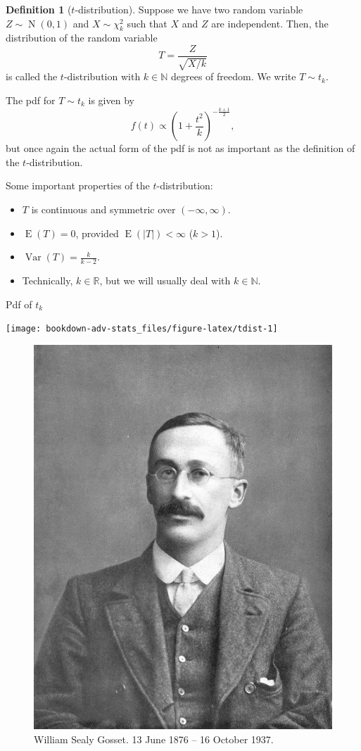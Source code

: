\documentclass[
]{book}
\providecommand{\tightlist}{%
  \setlength{\itemsep}{0pt}\setlength{\parskip}{0pt}}
\DeclareMathOperator{\E}{E}
\DeclareMathOperator{\Var}{Var}
\DeclareMathOperator{\N}{N}
\newcommand{\bbR}{\mathbb{R}}
\newcommand{\bbN}{\mathbb{N}}
\theoremstyle{definition}
\newtheorem{definition}{Definition}[chapter]
\theoremstyle{definition}
\theoremstyle{definition}
\theoremstyle{definition}
\theoremstyle{remark}
\begin{document}
\begin{definition}[$t$-distribution]
Suppose we have two random variable \(Z\sim\N(0,1)\) and \(X\sim\chi^2_k\) such that \(X\) and \(Z\) are independent.
Then, the distribution of the random variable
\[T = \frac{Z}{\sqrt{X/k}}\] is called the \(t\)-distribution with \(k\in\bbN\)
degrees of freedom. We write \(T\sim t_k\).
\end{definition}

The pdf for \(T \sim t_k\) is given by
\[f(t) \propto \left(1 + \frac{t^2}{k} \right)^{-\frac{k+1}{2}},\] but
once again the actual form of the pdf is not as important as the
definition of the \(t\)-distribution.

Some important properties of the \(t\)-distribution:

\begin{itemize}
\tightlist
\item
  \(T\) is continuous and symmetric over \((-\infty,\infty)\).
\item
  \(\E(T)=0\), provided \(\E(|T|) < \infty\) (\(k>1\)).
\item
  \(\Var(T) = \frac{k}{k-2}\).
\item
  Technically, \(k\in\bbR\), but we will usually deal with \(k\in\bbN\).
\end{itemize}

Pdf of \(t_k\)

\begin{center}\texttt{[image: bookdown-adv-stats\_files/figure-latex/tdist-1]} \end{center}

\begin{figure}

{\centering \includegraphics[width=0.6\linewidth]{figure/student} 

}

\caption{William Sealy Gosset. 13 June 1876 -- 16 October 1937.}\label{fig:student}
\end{figure}
\end{document}
